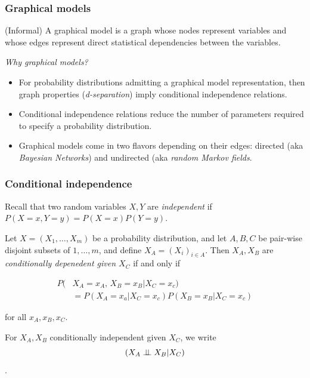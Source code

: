 \begin{frame}
\frametitle{Graphical models}
\begin{definition}
(Informal) A graphical model is a graph whose nodes represent variables and whose edges represent direct statistical dependencies between the variables.\newline
\end{definition}

\emph{Why graphical models?}
\begin{itemize}
\item For probability distributions admitting a graphical model representation, then graph properties (\emph{d-separation}) imply conditional independence relations.
\item Conditional independence relations reduce the number of parameters required to specify a probability distribution.
\item Graphical models come in two flavors depending on their edges: directed (aka \emph{Bayesian Networks}) and undirected (aka \emph{random Markov fields}.
\end{itemize}
\end{frame}

\begin{frame}
\frametitle{Conditional independence}

Recall that two random variables $X, Y$ are \emph{independent} if $P(X=x, Y=y) = P(X=x) P(Y=y)$.

\begin{definition}
Let $X = (X_1, \ldots, X_m)$ be a probability distribution, and let $A, B, C$ be pair-wise disjoint subsets of ${1, \ldots, m}$, and define $X_A = (X_i)_{i \in A}$. Then $X_A, X_B$ are \emph{conditionally depenedent given $X_C$} if and only if 

\begin{align*}
P(&X_A = x_A,  \,X_B = x_B | X_C = x_c) \\
&= P(X_A = x_a | X_C = x_c) P(X_B = x_B | X_C = x_c)
\end{align*}

for all $x_A, x_B, x_C$.\newline
\end{definition}

For $X_A, X_B$ conditionally independent given $X_C$, we write $$(X_A \perp\!\!\!\perp X_B | X_C)$$.
\end{frame}

